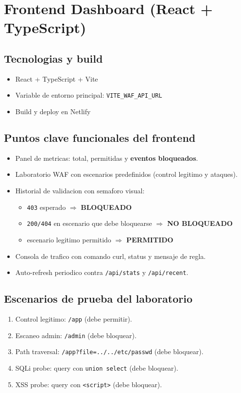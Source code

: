 \documentclass[12pt,a4paper]{article}
\begin{document}
\section{Frontend Dashboard (React + TypeScript)}
\subsection{Tecnologias y build}
\begin{itemize}
  \item React + TypeScript + Vite
  \item Variable de entorno principal: \texttt{VITE\_WAF\_API\_URL}
  \item Build y deploy en Netlify
\end{itemize}

\subsection{Puntos clave funcionales del frontend}
\begin{itemize}
  \item Panel de metricas: total, permitidas y \textbf{eventos bloqueados}.
  \item Laboratorio WAF con escenarios predefinidos (control legitimo y ataques).
  \item Historial de validacion con semaforo visual:
  \begin{itemize}
    \item \texttt{403} esperado $\Rightarrow$ \textbf{BLOQUEADO}
    \item \texttt{200/404} en escenario que debe bloquearse $\Rightarrow$ \textbf{NO BLOQUEADO}
    \item escenario legitimo permitido $\Rightarrow$ \textbf{PERMITIDO}
  \end{itemize}
  \item Consola de trafico con comando curl, status y mensaje de regla.
  \item Auto-refresh periodico contra \texttt{/api/stats} y \texttt{/api/recent}.
\end{itemize}

\subsection{Escenarios de prueba del laboratorio}
\begin{enumerate}
  \item Control legitimo: \texttt{/app} (debe permitir).
  \item Escaneo admin: \texttt{/admin} (debe bloquear).
  \item Path traversal: \texttt{/app?file=../../etc/passwd} (debe bloquear).
  \item SQLi probe: query con \texttt{union select} (debe bloquear).
  \item XSS probe: query con \texttt{<script>} (debe bloquear).
\end{enumerate}
\end{document}
